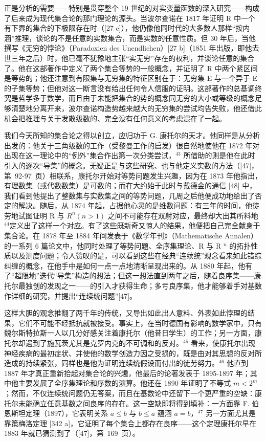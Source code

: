 正是分析的需要——特别是贯穿整个 19 世纪的对实变量函数的深入研究——构成了后来成为现代集合论的那门理论的源头。当波尔查诺在 1817 年证明 R 中一个有下界的集合的下极限存在时（{[}27 c{]}），他仍像他同时代的大多数人那样“按内涵”推理，谈论的不是任意的实数集合，而是实数的任意性质。但 30 年后，当他撰写《无穷的悖论》（Paradoxien des Unendlichen）{[}27 b{]}（1851 年出版，即他去世三年之后）时，他已毫不犹豫地主张“实无穷”存在的权利，并谈论任意的集合了。他在这部著作中定义了两个集合等势的一般概念，并证明了 R 中两个紧区间是等势的；他还注意到有限集与无穷集的特征区别在于：无穷集 E 与一个异于 E 的子集等势；但他对这一断言没有给出任何令人信服的证明。这部著作的总基调终究是哲学多于数学，而且由于未能把集合的势的概念同无穷的大小或等级的概念足够清楚地分离开来，波尔查诺构造势越来越大的无穷集的尝试均告失败，他还借此机会把推理与关于发散级数的、完全没有任何意义的考虑混在了一起。

我们今天所知的集合论之得以创立，应归功于 G. 康托尔的天才。他同样是从分析出发的：他关于三角级数的工作（受黎曼工作的启发）很自然地使他在 1872 年对出现在这一理论中的“例外”集合作出第一次分类尝试，\(^{43}\) 所借助的则是他在此时引入的逐次“导集”的概念。无疑正是与这些研究、也与他定义实数的方法（{[}47{]}，第~92-97~页）相联系，康托尔开始对等势问题发生兴趣，因为在 1873 年他指出，有理数集（或代数数集）是可数的；而在大约始于此时与戴德金的通信 {[}48{]} 中，我们看到他提出了整数集与实数集之间的等势问题，几周之后他便成功地给出了否定的解决。随后，从 1874 年起，占据他心灵的是维数问题：有三年的时间，他徒劳地试图证明 R 与 \(R^{n}(n > 1)\) 之间不可能存在双射对应，最终却大出其所料地\(^{44}\)定义出了这样一个对应。有了这些既新奇又惊人的结果，他便把自己完全献身于集合论。在 1878 年至 1884 年间发表于《数学年刊》（Mathematische Annalen）的一系列 6 篇论文中，他同时处理了等势问题、全序集理论、R 与 R \(^{n}\) 的拓扑性质以及测度问题；令人赞叹的是，可以看到这些在经典“连续统”观念看来如此错综纠缠的概念，在他手中是如何一点一点地清晰呈现出来的。从 1880 年起，他有了“超限地”迭代“导集”构造的想法；但这一想法直到两年之后，随着良序集——康托尔最独创的发现之一——的引入才获得生命；多亏良序集，他才能够着手对基数作详细的研究，并提出“连续统问题”{[}47{]}。

这样大胆的观念推翻了两千年的传统，又导出如此出人意料、外表如此悖理的结果，它们不可能不经抵抗就被接受。事实上，在当时德国有影响的数学家中，只有魏尔斯特拉斯一人以几分好感关注着康托尔（他昔日学生）的工作；另一方面，康托尔却遇到了施瓦茨尤其是克罗内克的不可调和的反对。\(^{45}\) 看来，使康托尔出现神经疾病的最初症状、并使他的数学创造力因之受损的，既是由对其思想的反对所造成的持续紧张，同样也是他为证明连续统假设而付出的徒劳努力。\(^{46}\) 他直到 1887 年才真正重新拾起对集合论的兴趣，他最后的论著发表于 1895-1897 年；其中他主要发展了全序集理论和序数的演算。他还在 1890 年证明了不等式 \(m < 2^{m}\)；然而，不仅连续统问题仍无答案，而且在基数论中还留下一个更严重的空缺：康托尔未能确立任意基数之间良序的存在。这一空缺即将得到填补：一方面靠 F. 伯恩斯坦定理（1897），它表明关系 \(a \leq b\) 与 \(b \leq a\) 蕴涵 \(a = b\)，\(^{47}\) 另一方面尤其是靠策梅洛定理 {[}342 a{]}，它证明了每个集合上都存在良序——这个定理康托尔早在 1883 年就已猜测到了（{[}47{]}，第~169~页）。

